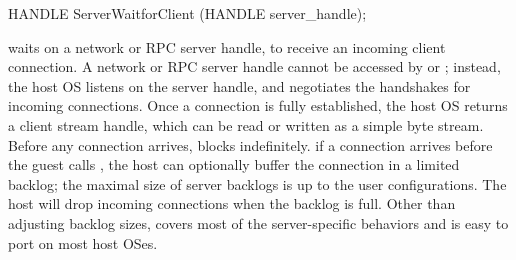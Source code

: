 

\begin{paldef}
HANDLE ServerWaitforClient (HANDLE server_handle);
\end{paldef} 


 waits on a network or RPC server handle, %
to receive an incoming client connection.
A network or RPC server handle cannot be accessed by  or ;
instead, the host OS listens on the server handle,
and negotiates the handshakes for incoming connections.
Once a connection is fully established,
the host OS returns a client stream handle, which can be read or written as a simple byte stream.
Before any connection arrives,  blocks indefinitely.
if a connection arrives before the guest calls ,
the host can optionally buffer the connection in a limited backlog; the maximal size of server backlogs is up to the user configurations. The host will drop incoming connections when the backlog is full.
Other than adjusting backlog sizes,  covers most of the server-specific behaviors
and is easy to port on most host OSes.














